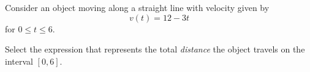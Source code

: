 \documentclass{ximera}
\author{Nela Lakos \and Kyle Parsons}
\begin{document}
\begin{exercise}

Consider an object moving along a straight line with velocity given by
\[
v(t) = 12-3t
\]
for $0\leq t\leq6$.

Select the expression that represents the total \emph{distance} the object travels on the interval $[0,6]$.
\begin{multipleChoice}
\end{multipleChoice}

\end{exercise}
\end{document}
